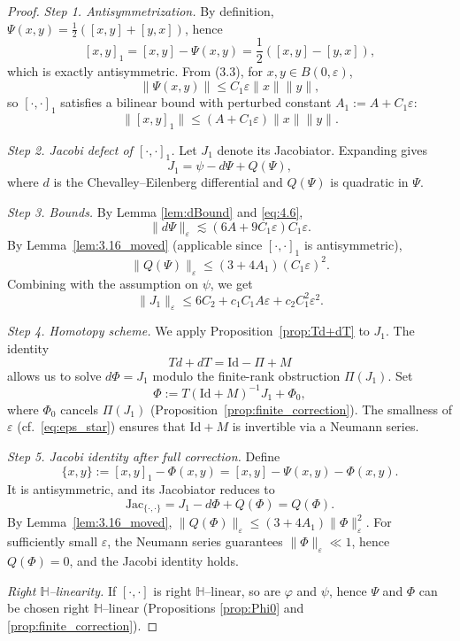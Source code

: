 \documentclass[10pt]{amsart}
\numberwithin{equation}{section}
\theoremstyle{remark}
\theoremstyle{definition}
\begin{document}
\begin{proof}
\emph{Step 1. Antisymmetrization.}
By definition, $\Psi(x, y) = \frac{1}{2}([x, y] + [y, x])$, hence
\[
[x, y]_1 = [x, y] - \Psi(x, y) = \frac{1}{2}([x, y] - [y, x]),
\]
which is exactly antisymmetric. From (3.3), for $x, y \in B(0, \varepsilon)$,
\[
\|\Psi(x, y)\| \leq C_1 \varepsilon \|x\| \|y\|,
\]
so $[\cdot, \cdot]_1$ satisfies a bilinear bound with perturbed constant $A_1 := A + C_1 \varepsilon$:
\begin{equation}\label{eq:4.6}
\|[x, y]_1\| \leq (A + C_1 \varepsilon) \|x\| \|y\|.
\end{equation}

\emph{Step 2. Jacobi defect of $[\cdot, \cdot]_1$.}
Let $J_1$ denote its Jacobiator. Expanding gives
\[
J_1 = \psi - d\Psi + Q(\Psi),
\]
where $d$ is the Chevalley--Eilenberg differential and $Q(\Psi)$ is quadratic in $\Psi$.

\emph{Step 3. Bounds.}
By Lemma \ref{lem:dBound} and \eqref{eq:4.6},
\[
\|d\Psi\|_\varepsilon \lesssim (6A + 9C_1 \varepsilon) C_1 \varepsilon.
\]
By Lemma~\ref{lem:3.16_moved} (applicable since $[\cdot, \cdot]_1$ is antisymmetric),
\[
\|Q(\Psi)\|_\varepsilon \leq (3 + 4A_1)(C_1 \varepsilon)^2.
\]
Combining with the assumption on $\psi$, we get
\[
\|J_1\|_\varepsilon \leq 6C_2 + c_1 C_1 A \varepsilon + c_2 C_1^2 \varepsilon^2.
\]

\emph{Step 4. Homotopy scheme.}
We apply Proposition~\ref{prop:Td+dT} to $J_1$. The identity
\[
T d + dT = \mathrm{Id} - \Pi + M
\]
allows us to solve $d\Phi = J_1$ modulo the finite-rank obstruction $\Pi(J_1)$. Set
\[
\Phi := T(\mathrm{Id}+M)^{-1} J_1 + \Phi_0,
\]
where $\Phi_0$ cancels $\Pi(J_1)$ (Proposition~\ref{prop:finite_correction}). The smallness of $\varepsilon$ (cf.\ \eqref{eq:eps_star}) ensures that $\mathrm{Id}+M$ is invertible via a Neumann series.


\emph{Step 5. Jacobi identity after full correction.}
Define
\[
\{x, y\} := [x, y]_1 - \Phi(x, y) = [x, y] - \Psi(x, y) - \Phi(x, y).
\]
It is antisymmetric, and its Jacobiator reduces to
\[
\mathrm{Jac}_{\{\cdot,\cdot\}} = J_1 - d\Phi + Q(\Phi) = Q(\Phi).
\]
By Lemma~\ref{lem:3.16_moved}, $\|Q(\Phi)\|_\varepsilon \leq (3 + 4A_1)\|\Phi\|_\varepsilon^2$. For sufficiently small $\varepsilon$, the Neumann series guarantees $\|\Phi\|_\varepsilon \ll 1$, hence $Q(\Phi) = 0$, and the Jacobi identity holds.

\emph{Right $\mathbb{H}$--linearity.}
If $[\cdot, \cdot]$ is right $\mathbb{H}$--linear, so are $\varphi$ and $\psi$, hence $\Psi$ and $\Phi$ can be chosen right $\mathbb{H}$--linear (Propositions \ref{prop:Phi0} and \ref{prop:finite_correction}).
\end{proof}
\end{document}
